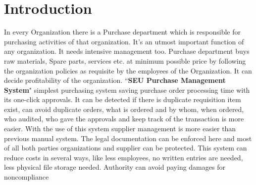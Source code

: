 \documentclass[12pt]{report} %
\begin{document}
\cleardoublepage
\clearpage




\setcounter{page}{1}
\thispagestyle{empty}
\listoffigures
\thispagestyle{empty}
\clearpage








\chapter{Introduction}
\setcounter{page}{1}    %
\thispagestyle{empty}    %
In every Organization there is a Purchase department which is responsible for purchasing activities of that organization. It's an utmost important function of any organization. It needs intensive management too. Purchase department buys raw materials, Spare parts, services etc. at minimum possible price by following the organization policies as requisite by the employees of the Organization. It can decide profitability of the organization. ``\textbf{SEU Purchase Management System}" simplest purchasing system saving purchase order processing time with its one-click approvals. It can be detected if there is duplicate requisition item exist, can avoid duplicate orders, what is ordered and by whom, when ordered, who audited, who gave the approvals and keep track of the transaction is more easier. With the use of this system supplier management is more easier than previous manual system. The legal documentation can be enforced here and most of all both parties organizations and supplier can be protected. This system can reduce costs in several ways, like less employees, no written entries are needed, less physical file storage needed. Authority can avoid paying damages for noncompliance 


\end{document}
